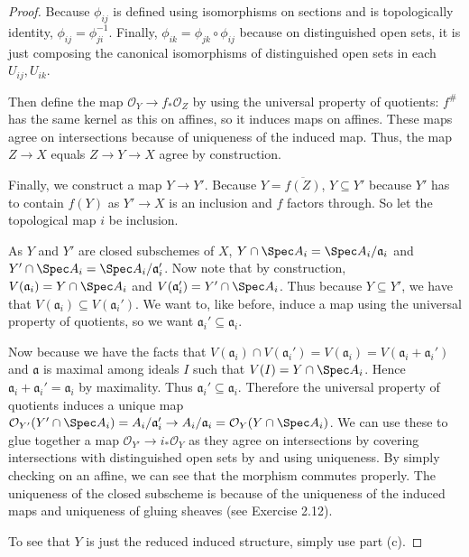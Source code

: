 \begin{proof}
	Because $\phi _{ij} $ is defined using isomorphisms on sections and is topologically identity, $\phi _{ij} = \phi _{ji}^{-1} $.
	Finally, $\phi _{ik} = \phi _{jk} \circ \phi _{ij} $ because on distinguished open sets, it is just composing the canonical isomorphisms of distinguished open sets in each $U_{ij},U_{ik} $.

	Then define the map $\mathcal{O}_Y\to f_\ast \mathcal{O}_Z $ by using the universal property of quotients: $f^\# $ has the same kernel as this on affines, so it induces maps on affines.
	These maps agree on intersections because of uniqueness of the induced map.
	Thus, the map $Z\to X $ equals $Z\to Y\to X $ agree by construction.

	Finally, we construct a map $Y\to Y' $.
	Because $Y = \overline{f(Z)}  $, $Y \subseteq Y'$ because $Y' $ has to contain $f(Y) $ as $Y' \to X $ is an inclusion and $f $ factors through.
	So let the topological map $i $ be inclusion.

	As $Y $ and $Y' $ are closed subschemes of $X $, $Y\cap \Spec A_i = \Spec A_i / \mathfrak{a}_i $ and $Y' \cap \Spec A_i = \Spec A_i / \mathfrak{a}'_i$.
	Now note that by construction, $V(\mathfrak{a}_i) = Y\cap \Spec A_i $ and $V(\mathfrak{a}'_i) = Y'\cap \Spec A_i $.
	Thus because $Y \subseteq Y' $, we have that $V(\mathfrak{a}_i) \subseteq V(\mathfrak{a}_i') $.
	We want to, like before, induce a map using the universal property of quotients, so we want $\mathfrak{a}_i' \subseteq \mathfrak{a}_i $.

	Now because we have the facts that $V(\mathfrak{a}_i) \cap V(\mathfrak{a}_i') = V(\mathfrak{a}_i) = V(\mathfrak{a}_i + \mathfrak{a}_i') $ and $\mathfrak{a} $ is maximal among ideals $I $ such that $V(I) = Y\cap \Spec A_i $.
	Hence $\mathfrak{a}_i + \mathfrak{a}_i' = \mathfrak{a}_i$ by maximality.
	Thus $\mathfrak{a}_i' \subseteq \mathfrak{a}_i $.
	Therefore the universal property of quotients induces a unique map $\mathcal{O}_{Y'}(Y'\cap \Spec A_i) = A_i / \mathfrak{a}'_i \to A_i / \mathfrak{a}_i = \mathcal{O}_{Y}(Y\cap \Spec A_i)$.
	We can use these to glue together a map $\mathcal{O}_{Y'}\to i_\ast\mathcal{O}_Y$ as they agree on intersections by covering intersections with distinguished open sets by  and using uniqueness.
	By simply checking on an affine, we can see that the morphism commutes properly.
	The uniqueness of the closed subscheme is because of the uniqueness of the induced maps and uniqueness of gluing sheaves (see Exercise 2.12).

	To see that $Y $ is just the reduced induced structure, simply use part (c).
\end{proof}

